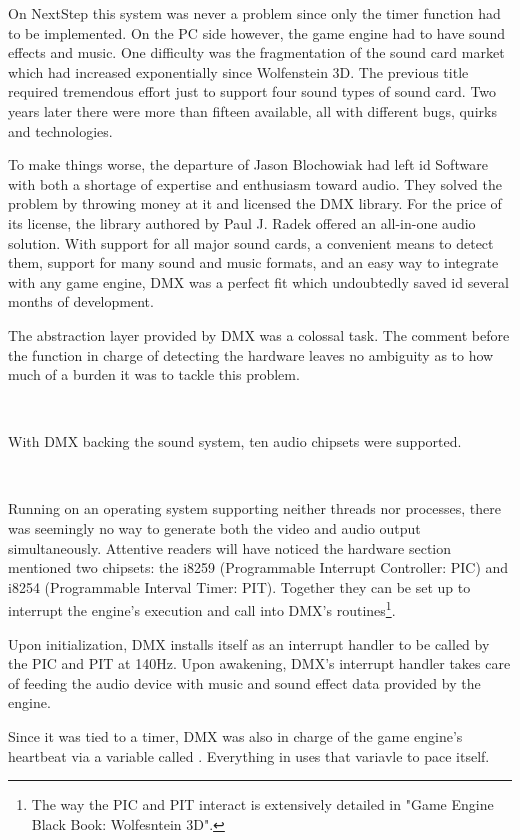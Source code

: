 On NextStep this system was never a problem since only the timer function had to be implemented. On the PC side however, the game engine had to have sound effects and music. One difficulty was the fragmentation of the sound card market which had increased exponentially since Wolfenstein 3D. The previous title required tremendous effort just to support four sound types of sound card. Two years later there were more than fifteen available, all with different bugs, quirks and technologies.\\
\par
To make things worse, the departure of Jason Blochowiak had left id Software with both a shortage of expertise and enthusiasm toward audio. They solved the problem by throwing money at it and licensed the DMX library. For the price of its license, the library authored by Paul J. Radek offered an all-in-one audio solution. With support for all major sound cards, a convenient means to detect them, support for many sound and music formats, and an easy way to integrate with any game engine, DMX was a perfect fit which undoubtedly saved id several months of development.





The abstraction layer provided by DMX was a colossal task. The comment before the function in charge of detecting the hardware leaves no ambiguity as to how much of a burden it was to tackle this problem.\\
\par
{}\\
\par
With DMX backing the sound system, ten audio chipsets were supported.\\
\par
{}\\
\par
Running on an operating system supporting neither threads nor processes, there was seemingly no way to generate both the video and audio output simultaneously. Attentive readers will have noticed the hardware section mentioned two chipsets: the i8259 (Programmable Interrupt Controller: PIC) and i8254 (Programmable Interval Timer: PIT). Together they can be set up to interrupt the engine's execution and call into DMX's routines\footnote{The way the PIC and PIT interact is extensively detailed in "Game Engine Black Book: Wolfesntein 3D".}.\\
\par
Upon initialization, DMX installs itself as an interrupt handler to be called by the PIC and PIT at 140Hz. Upon awakening, DMX's interrupt handler takes care of feeding the audio device with music and sound effect data provided by the engine.\\
\par
Since it was tied to a timer, DMX was also in charge of the game engine's heartbeat via a variable called . Everything in \doom{} uses that variavle to pace itself.
\par


